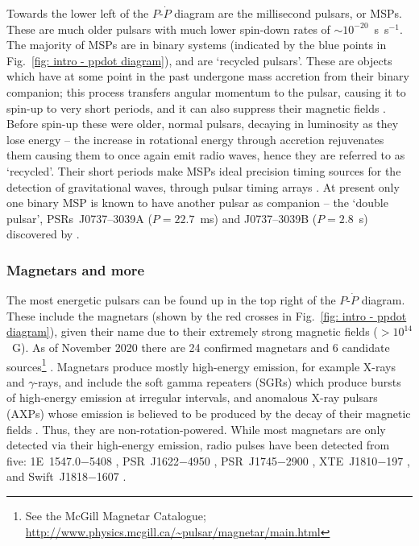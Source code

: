 Towards the lower left of the $P$-$\dot{P}$ diagram are the millisecond pulsars, or MSPs. These are much older pulsars with much lower spin-down rates of ${\sim}10^{-20}$~s~s$^{-1}$. The majority of MSPs are in binary systems (indicated by the blue points in Fig.~\ref{fig: intro - ppdot diagram}), and are `recycled pulsars'. These are objects which have at some point in the past undergone mass accretion from their binary companion; this process transfers angular momentum to the pulsar, causing it to spin-up to very short periods, and it can also suppress their magnetic fields \citep{BKxx1974, SMSN1989}. Before spin-up these were older, normal pulsars, decaying in luminosity as they lose energy -- the increase in rotational energy through accretion rejuvenates them causing them to once again emit radio waves, hence they are referred to as `recycled'. Their short periods make MSPs ideal precision timing sources for the detection of gravitational waves, through pulsar timing arrays \citep[e.g][]{FBxx1990,MHB+2013}. At present only one binary MSP is known to have another pulsar as companion -- the `double pulsar', PSRs~J0737–3039A ($P=22.7$~ms) and J0737–3039B ($P=2.8$~s) discovered by \citet{BDP+2003}.
\subsubsection{Magnetars and more}
\label{sec: intro - general intro - pulsar population - magnetars etc}

The most energetic pulsars can be found up in the top right of the $P$-$\dot{P}$ diagram. These include the magnetars (shown by the red crosses in Fig.~\ref{fig: intro - ppdot diagram}), given their name due to their extremely strong magnetic fields ($>10^{14}$~G). As of November 2020 there are 24 confirmed magnetars and 6 candidate sources\footnote{See the McGill Magnetar Catalogue; \url{http://www.physics.mcgill.ca/~pulsar/magnetar/main.html}} \citep{OKxx2014}. Magnetars produce mostly high-energy emission, for example X-rays and $\gamma$-rays, and include the soft gamma repeaters (SGRs) which produce bursts of high-energy emission at irregular intervals, and anomalous X-ray pulsars (AXPs) whose emission is believed to be produced by the decay of their magnetic fields \citep{TDxx1995, TDxx1996, Mxxx2008}. Thus, they are non-rotation-powered. While most magnetars are only detected via their high-energy emission, radio pulses have been detected from five: 1E~1547.0$-$5408 \citep{CRHR2007a}, PSR~J1622$-$4950 \citep{LBB+2010}, PSR~J1745$-$2900 \citep{EFK+2013}, XTE~J1810$-$197 \citep{CRH+2006}, and Swift~J1818$-$1607 \citep{ERB+2020, LSJB2020}.

